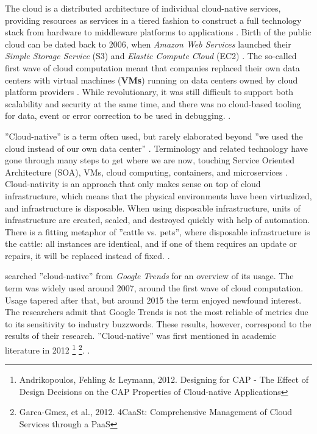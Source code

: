 \documentclass[utf8,english]{gradu3}
\begin{document}
The cloud is a distributed architecture of individual cloud-native services,
providing resources as services in a tiered fashion to construct a full
technology stack from hardware to middleware platforms to applications \parencite[1]{Pahl2018}.
Birth of the public cloud can be dated back to 2006, when \textit{Amazon Web
  Services} launched their \textit{Simple Storage Service} (S3) and
\textit{Elastic Compute Cloud} (EC2) \parencite[1]{Kratzke2017}. The so-called
first wave of cloud computation meant that companies replaced their own data
centers with virtual machines (\textbf{VMs}) running on data centers owned by cloud platform
providers \parencite[17]{Gannon2017}. While revolutionary, it was still
difficult to support both scalability and security at the same time, and there
was no cloud-based tooling for data, event or error correction to be used in
debugging. \parencite[18]{Gannon2017}.

''Cloud-native'' is a term often used, but rarely elaborated beyond ''we
used the cloud instead of our own data center'' \parencite[17]{Gannon2017}.
Terminology and related technology have gone through many steps to get where we
are now, touching Service Oriented Architecture (SOA), VMs,
cloud computing, containers, and microservices \parencite[3]{Kratzke2017}.
Cloud-nativity is an approach
that only makes sense on top of cloud infrastructure, which means that the
physical environments have been virtualized, and infrastructure is disposable.
When using disposable infrastructure, units of infrastructure are created,
scaled, and destroyed quickly with help of automation. There is a fitting
metaphor of ''cattle vs. pets'', where disposable infrastructure is the cattle:
all instances are identical, and if one of them requires an update or repairs,
it will be replaced instead of fixed. \parencite{Microsoft2022-CNA}.

\textcite[8]{Kratzke2017} searched ''cloud-native'' from \textit{Google Trends}
for an overview of its usage. The term was widely used around 2007, around the
first wave of cloud computation. Usage tapered after that, but around 2015 the
term enjoyed newfound interest. The researchers admit that Google Trends is not
the most reliable of metrics due to its sensitivity to industry buzzwords. These
results, however, correspond to the results of their research.
''Cloud-native'' was first mentioned in academic
literature in 2012 \footnote{Andrikopoulos, Fehling \& Leymann, 2012. Designing
  for CAP - The Effect of Design Decisions on the CAP Properties of Cloud-native
  Applications} \footnote{Garca-Gmez, et al., 2012. 4CaaSt: Comprehensive
  Management of Cloud Services through a PaaS}. \parencite[8]{Kratzke2017}.
\end{document}

